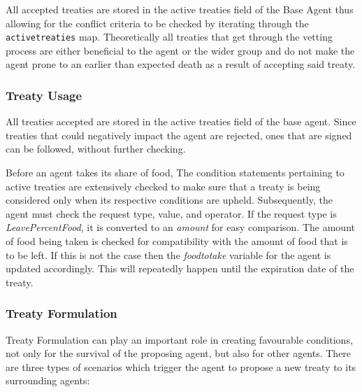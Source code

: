 All accepted treaties are stored in the active treaties field of the Base Agent thus allowing for the conflict criteria to be checked by iterating through the \texttt{activetreaties} map. Theoretically all treaties that get through the vetting process are either beneficial to the agent or the wider group and do not make the agent prone to an earlier than expected death as a result of accepting said treaty.

\subsubsection{Treaty Usage}
\label{subsec: Treaty Usage}
All treaties accepted are stored in the active treaties field of the base agent. Since treaties that could negatively impact the agent are rejected, ones that are signed can be followed, without further checking. 

Before an agent takes its share of food, The condition statements pertaining to active treaties are extensively checked to make sure that a treaty is being considered only when its respective conditions are upheld. Subsequently, the agent must check the request type, value, and operator. If the request type is \textit{LeavePercentFood}, it is converted to an \textit{amount} for easy comparison. 
The amount of food being taken is checked for compatibility with the amount of food that is to be left. If this is not the case then the \textit{foodtotake} variable for the agent is updated accordingly.
This will repeatedly happen until the expiration date of the treaty.

\subsubsection{Treaty Formulation}
\label{subsec: Treaty Formulation}
Treaty Formulation can play an important role in creating favourable conditions, not only for the survival of the proposing agent, but also for other agents. There are three types of scenarios which trigger the agent to propose a new treaty to its surrounding agents:

